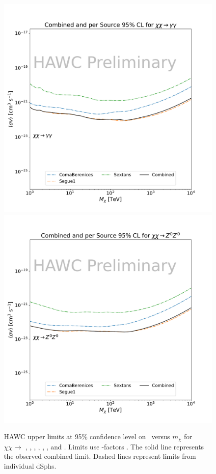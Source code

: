 \begin{figure}[h]
{    \includegraphics[scale=0.21]{figures/mtd_hawc_dm/results/Combined95_New_duck_gammagamma_.pdf}
    \includegraphics[scale=0.21]{figures/mtd_hawc_dm/results/Combined95_New_duck_zz_.pdf}
    }
    \caption{HAWC upper limits at 95\% confidence level on \sv~versus $m_\chi$ for $\chi\chi \rightarrow $ , \parpar{\nu_\mu}, \parpar{\nu_\tau}, , \parpar{\mu}, \parpar{\tau}, \pp{\gamma} and . Limits use \LS \J-factors \cite{DM_Strigari20}. The solid line represents the observed combined limit. Dashed lines represent limits from individual dSphs.}
\label{fig:mtd_limits_2of2}
\end{figure}


